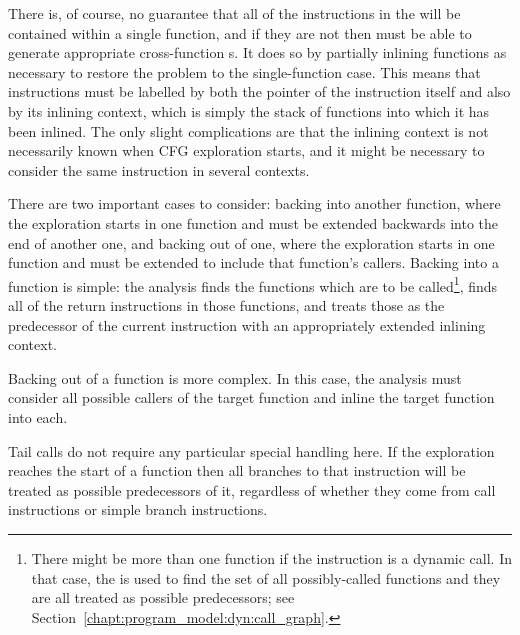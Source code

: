 \label{sect:derive:cross_function_cfgs}

There is, of course, no guarantee that all of the instructions in the
 will be contained within a single function,
and if they are not then {\technique} must be able to generate
appropriate cross-function s.  It does so by partially
inlining functions as necessary to restore the problem to the
single-function case.  This means that instructions must be labelled
by both the pointer of the instruction itself and also by its inlining
context, which is simply the stack of functions into which it has been
inlined.  The only slight complications
are that the inlining context is not necessarily known when CFG
exploration starts, and it might be necessary to consider the same
instruction in several contexts.


There are two important cases to consider: backing into another
function, where the exploration starts in one function and must be
extended backwards into the end of another one, and backing out of
one, where the exploration starts in one function and must be extended
to include that function's callers.  Backing into a function is
simple: the analysis finds the functions which are to be
called\footnote{There might be more than one function if the
  instruction is a dynamic call.  In that case, the  is used to find the set of all possibly-called functions
  and they are all treated as possible predecessors; see
  Section~\ref{chapt:program_model:dyn:call_graph}.}, finds all of the
return instructions in those functions, and treats those as the
predecessor of the current instruction with an appropriately extended
inlining context.

Backing out of a function is more complex.  In this case, the analysis
must consider all possible callers of the target function and inline
the target function into each.  


Tail calls do not require any particular special handling here.  If
the exploration reaches the start of a function then all branches to
that instruction will be treated as possible predecessors of it,
regardless of whether they come from call instructions or simple
branch instructions.

